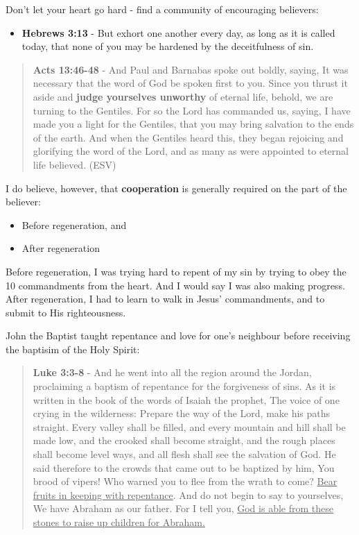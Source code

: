 \documentclass[11pt]{article}
\begin{document}
Don't let your heart go hard - find a community of encouraging believers:
\begin{itemize}
\item \textbf{Hebrews 3:13} - But exhort one another every day, as long as it is called today, that none of you may be hardened by the deceitfulness of sin.
\end{itemize}

\begin{quote}
\textbf{Acts 13:46-48} - And Paul and Barnabas spoke out boldly, saying, It was necessary that the word of God be spoken first to you.  Since you thrust it aside and \textbf{judge yourselves unworthy} of eternal life, behold, we are turning to the Gentiles.  For so the Lord has commanded us, saying, I have made you a light for the Gentiles, that you may bring salvation to the ends of the earth.  And when the Gentiles heard this, they began rejoicing and glorifying the word of the Lord, and as many as were appointed to eternal life believed. (ESV)
\end{quote}

I do believe, however, that \textbf{cooperation} is generally required on the part of the believer:
\begin{itemize}
\item Before regeneration, and
\item After regeneration
\end{itemize}

Before regeneration, I was trying hard to repent of my sin by trying to obey the 10 commandments from the heart.
And I would say I was also making progress.
After regeneration, I had to learn to walk in Jesus' commandments, and to submit to His righteousness.

John the Baptist taught repentance and love for one's neighbour before receiving the baptisim of the Holy Spirit:

\begin{quote}
\textbf{Luke 3:3-8} - And he went into all the region around the Jordan, proclaiming a baptism of repentance for the forgiveness of sins. As it is written in the book of the words of Isaiah the prophet, The voice of one crying in the wilderness: Prepare the way of the Lord, make his paths straight. Every valley shall be filled, and every mountain and hill shall be made low, and the crooked shall become straight, and the rough places shall become level ways, and all flesh shall see the salvation of God. He said therefore to the crowds that came out to be baptized by him, You brood of vipers! Who warned you to flee from the wrath to come? \uline{Bear fruits in keeping with repentance}. And do not begin to say to yourselves, We have Abraham as our father. For I tell you, \uline{God is able from these stones to raise up children for Abraham.}
\end{quote}
\end{document}
